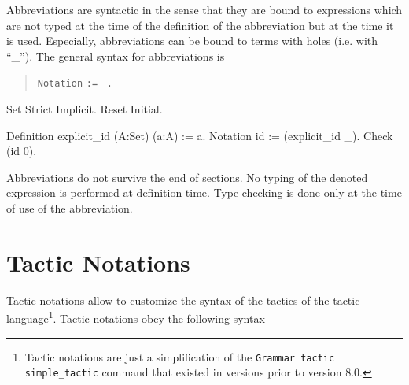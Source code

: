 Abbreviations are syntactic in the sense that they are bound to
expressions which are not typed at the time of the definition of the
abbreviation but at the time it is used. Especially, abbreviations can
be bound to terms with holes (i.e. with ``\_''). The general syntax
for abbreviations is
\begin{quote}
\texttt{Notation}  {\ident} \sequence{\ident} {\ident} \texttt{:=} {\term} 
 ~\verb=.=
\end{quote}

\Example
\begin{coq_eval}
Set Strict Implicit.
Reset Initial.
\end{coq_eval}
\begin{coq_example}
Definition explicit_id (A:Set) (a:A) := a.
Notation id := (explicit_id _).
Check (id 0).
\end{coq_example}

Abbreviations do not survive the end of sections. No typing of the denoted
expression is performed at definition time. Type-checking is done only
at the time of use of the abbreviation.


\section{Tactic Notations}

Tactic notations allow to customize the syntax of the tactics of the
tactic language\footnote{Tactic notations are just a simplification of
the {\tt Grammar tactic simple\_tactic} command that existed in
versions prior to version 8.0.}. Tactic notations obey the following
syntax
\medskip

